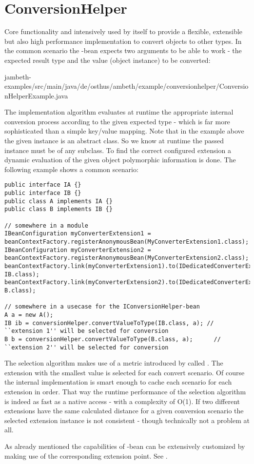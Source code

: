 \section{ConversionHelper}
\label{feature:ConversionHelper}
\ClearAPI
Core functionality and intensively used by \AMBETH{} itself to provide a flexible, extensible but also high performance implementation to convert objects to other types. In the common scenario the -bean expects two arguments to be able to work - the expected result type and the value (object instance) to be converted:

{jambeth-examples/src/main/java/de/osthus/ambeth/example/conversionhelper/ConversionHelperExample.java}

The implementation algorithm evaluates at runtime the appropriate internal conversion process according to the given expected type - which is far more sophisticated than a simple key/value mapping. Note that in the example above the given  instance is an abstract class. So we know at runtime the passed instance must be of any subclass. To find the correct configured extension a dynamic evaluation of the given object polymorphic information is done. The following example shows a common scenario:

\begin{lstlisting}[style=Java]
public interface IA {}
public interface IB {}
public class A implements IA {}
public class B implements IB {}

// somewhere in a module
IBeanConfiguration myConverterExtension1 = beanContextFactory.registerAnonymousBean(MyConverterExtension1.class);
IBeanConfiguration myConverterExtension2 = beanContextFactory.registerAnonymousBean(MyConverterExtension2.class);
beanContextFactory.link(myConverterExtension1).to(IDedicatedConverterExtendable.class).with(IA.class, IB.class);
beanContextFactory.link(myConverterExtension2).to(IDedicatedConverterExtendable.class).with(IA.class, B.class);

// somewhere in a usecase for the IConversionHelper-bean
A a = new A();
IB ib = conversionHelper.convertValueToType(IB.class, a); // ``extension 1'' will be selected for conversion
B b = conversionHelper.convertValueToType(B.class, a);		// ``extension 2'' will be selected for conversion
\end{lstlisting}

The selection algorithm makes use of a metric introduced by \AMBETH{} called . The extension with the smallest value is selected for each convert scenario. Of course the internal implementation is smart enough to cache each scenario for each extension in order. That way the runtime performance of the selection algorithm is indeed as fast as a native  access - with a complexity of O(1). If two different extensions have the same calculated distance for a given conversion scenario the selected extension instance is not consistent - though technically not a problem at all.

As already mentioned the capabilities of -bean can be extensively customized by making use of the corresponding extension point. See .